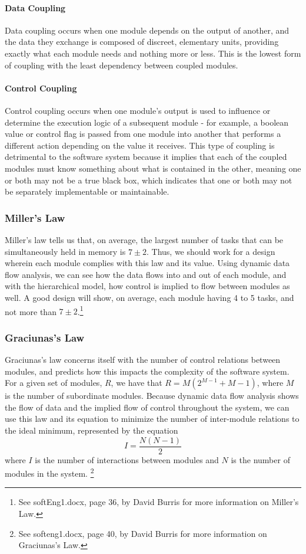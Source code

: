 \documentclass{article}
\begin{document}
			\paragraph{Data Coupling}
				Data coupling occurs when one module depends on the output of another, and the data they exchange is composed of discreet, elementary units, providing exactly what each module needs and nothing more or less. This is the lowest form of coupling with the least dependency between coupled modules. 
			\paragraph{Control Coupling}
				Control coupling occurs when one module's output is used to influence or determine the execution logic of a subsequent module - for example, a boolean value or control flag is passed from one module into another that performs a different action depending on the value it receives. This type of coupling is detrimental to the software system because it implies that each of the coupled modules must know something about what is contained in the other, meaning one or both may not be a true black box, which indicates that one or both may not be separately implementable or maintainable. 
		\subsubsection{Miller's Law}
			Miller's law tells us that, on average, the largest number of tasks that can be simultaneously held in memory is $7\pm2$. Thus, we should work for a design wherein each module complies with this law and its value. Using dynamic data flow analysis, we can see how the data flows into and out of each module, and with the hierarchical model, how control is implied to flow between modules as well. A good design will show, on average, each module having 4 to 5 tasks, and not more than $7\pm2$.\footnote{See softEng1.docx, page 36, by David Burris for more information on Miller's Law.}  
		\subsubsection{Graciunas's Law}
			Graciunas's law concerns itself with the number of control relations between modules, and predicts how this impacts the complexity of the software system. For a given set of modules, $R$, we have that $R = M(2^{M-1} + M - 1)$, where $M$ is the number of subordinate modules. Because dynamic data flow analysis shows the flow of data and the implied flow of control throughout the system, we can use this law and its equation to minimize the number of inter-module relations to the ideal minimum, represented by the equation 
			$$I = \frac{N(N - 1)}{2}$$
			where $I$ is the number of interactions between modules and $N$ is the number of modules in the system. \footnote{See softeng1.docx, page 40, by David Burris for more information on Graciunas's Law.}
\end{document}
